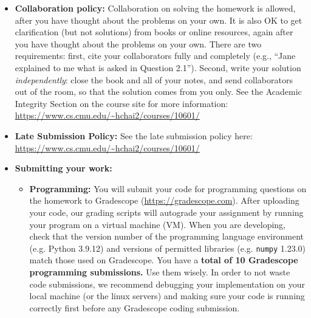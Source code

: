\documentclass[11pt,addpoints,answers]{exam}
\begin{document}
\begin{itemize}
\item \textbf{Collaboration policy:} Collaboration on solving the homework is allowed, after you have thought about the problems on your own. It is also OK to get clarification (but not solutions) from books or online resources, again after you have thought about the problems on your own. There are two requirements: first, cite your collaborators fully and completely (e.g., ``Jane explained to me what is asked in Question 2.1''). Second, write your solution {\em independently}: close the book and all of your notes, and send collaborators out of the room, so that the solution comes from you only.  See the Academic Integrity Section on the course site for more information: \url{https://www.cs.cmu.edu/~hchai2/courses/10601/}

\item\textbf{Late Submission Policy:} See the late submission policy here: \url{https://www.cs.cmu.edu/~hchai2/courses/10601/}

\item\textbf{Submitting your work:} 

\begin{itemize}


\item \textbf{Programming:} You will submit your code for programming questions on the homework to Gradescope (\url{https://gradescope.com}). After uploading your code, our grading scripts will autograde your assignment by running your program on a virtual machine (VM). When you are developing, check that the version number of the programming language environment (e.g. Python 3.9.12) and versions of permitted libraries (e.g.  \texttt{numpy} 1.23.0) match those used on Gradescope. You have a \textbf{total of 10 Gradescope programming submissions.} Use them wisely. In order to not waste code submissions, we recommend debugging your implementation on your local machine (or the linux servers) and making sure your code is running correctly first before any Gradescope coding submission.


\end{itemize}
\end{itemize}
\end{document}
